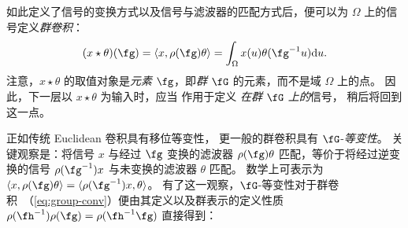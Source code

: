 如此定义了信号的变换方式以及信号与滤波器的匹配方式后，便可以为 $\Omega$ 上的信号定义{\em 群卷积}：
\begin{equation}
    \label{eq:group-conv}
    (x \star \theta)(\fg) = \langle x, \rho(\fg) \theta \rangle = \int_\Omega x(u) \theta(\fg^{-1} u) \mathrm{d}u. %
\end{equation}
%
注意，$x \star \theta$ 的取值对象是{\em 元素} $\fg$，即{\em 群} $\fG$ 的元素，而不是域 $\Omega$ 上的点。
因此，下一层以 $x \star \theta$ 为输入时，应当
作用于定义%
{\em 在群} $\fG$ {\em 上的}信号，%
稍后将回到这一点。

正如传统 Euclidean 卷积具有移位等变性，
更一般的群卷积具有 $\fG$-{\em 等变性}。
关键观察是：将信号 $x$ 与经过 $\fg$ 变换的滤波器 $\rho(\fg) \theta$ 匹配，等价于将经过逆变换的信号 $\rho(\fg^{-1}) x$ 与未变换的滤波器 $\theta$ 匹配。
数学上可表示为 $\langle x, \rho(\fg) \theta \rangle = \langle \rho(\fg^{-1}) x, \theta \rangle$。
%
%
有了这一观察，$\fG$-等变性对于群卷积~（\ref{eq:group-conv}）便由其定义以及群表示的定义性质 $\rho(\fh^{-1}) \rho(\fg) = \rho(\fh^{-1} \fg)$ 直接得到：

